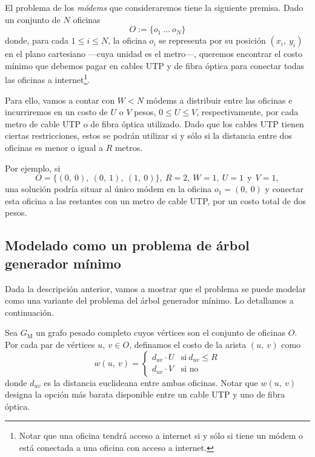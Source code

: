 El problema de los \textit{módems} que consideraremos tiene la siguiente premisa. Dado un conjunto de $N$ oficinas 
\begin{equation*}
    O := \{o_1\ ...\ o_N\}    
\end{equation*}
donde, para cada $1 \leq i \leq N$, la oficina $o_i$ se representa por su posición $(x_i,\ y_i)$ en el plano cartesiano ---cuya unidad es el metro---, queremos encontrar el costo mínimo que debemos pagar en cables UTP y de fibra óptica para conectar todas las oficinas a internet\footnote{Notar que una oficina tendrá acceso a internet si y sólo si tiene un módem o está conectada a una oficina con acceso a internet.}.

Para ello, vamos a contar con $W < N$ módems a distribuir entre las oficinas e incurriremos en un costo de $U$ o $V$ pesos, $0 \leq U \leq V$, respectivamente, por cada metro de cable UTP o de fibra óptica utilizado. Dado que los cables UTP tienen ciertas restricciones, estos se podrán utilizar si y sólo si la distancia entre dos oficinas es menor o igual a $R$ metros. 

Por ejemplo, si 
\begin{equation*}
     O = \{(0,\ 0),\ (0,\ 1),\ (1,\ 0)\},\ R = 2,\ W = 1,\ U = 1\ \: \text{y}\ \: V = 1, 
\end{equation*}
una solución podría situar al único módem en la oficina $o_1 = (0,\ 0)$ y conectar esta oficina a las restantes con un metro de cable UTP, por un costo total de dos pesos.

\subsection{Modelado como un problema de árbol generador mínimo}\label{modelo}

Dada la descripción anterior, vamos a mostrar que el problema se puede modelar como una variante del problema del árbol generador mínimo. Lo detallamos a continuación.

Sea $G_{\text{M}}$ un grafo pesado completo cuyos vértices son el conjunto de oficinas $O$. Por cada par de vértices $u,\ v \in O$, definamos el costo de la arista $(u,\ v)$ como
\begin{equation*}
    w(u,\ v) = \begin{cases}
        d_{uv} \cdot U &\text{si}\ d_{uv} \leq R \\
        d_{uv} \cdot V & \text{si no}
    \end{cases}
\end{equation*}
donde $d_{uv}$ es la distancia euclideana entre ambas oficinas. Notar que $w(u,\ v)$ designa la opción más barata disponible entre un cable UTP y uno de fibra óptica. 

